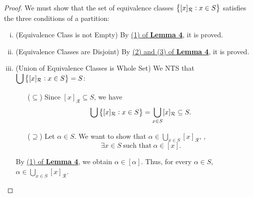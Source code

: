 \documentclass[11pt,openany]{article}
\begin{document}
\begin{proof}
	We must show that the set of equivalence classes $\set{[x]_{\mathcal{R}}:x\in S}$ satisfies the three conditions of a partition:
	\begin{enumerate}[(i)]
		\item (Equivalence Class is not Empty) By \hyperlink{lemma-4-1}{(1) of \textbf{Lemma 4}}, it is proved.
		\item (Equivalence Classes are Disjoint) By \hyperlink{lemma-4-2}{(2) and (3) of \textbf{Lemma 4}}, it is proved.
		\item (Union of Equivalence Classes is Whole Set) We NTS that $\displaystyle\bigcup\set{[x]_{\mathcal{R}}:x\in S}=S$:
		\begin{itemize}
			\item[($\subseteq$)] Since $[x]_{\mathcal{R}}\subseteq S$, we have \begin{align*}
				\bigcup\set{[x]_{\mathcal{R}}:x\in S}=\bigcup_{x\in S}[x]_{\mathcal{R}}\subseteq S.
			\end{align*}
			\item[($\supseteq$)] Let $\alpha\in S$. We want to show that $\displaystyle\alpha\in\bigcup_{x\in S}[x]_{\mathcal{R}}$, \ie, \[
			\exists x\in S\ \text{such that}\ \alpha\in[x].
			\]
		\end{itemize} By \hyperlink{lemma-4-1}{(1) of \textbf{Lemma 4}}, we obtain $\alpha\in[\alpha]$. Thus, for every $\alpha\in S$, $\displaystyle\alpha\in\bigcup_{x\in S}[x]_{\mathcal{R}}$.
	\end{enumerate}
\end{proof}
\end{document}
